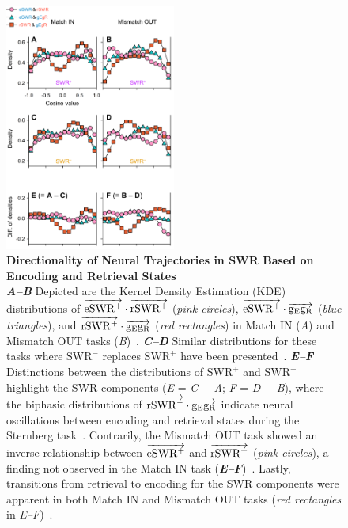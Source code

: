 \documentclass[final,3p,times,twocolumn]{elsarticle}
\begin{document}
        \clearpage
        \begin{figure}[ht]
        	\centering
            \includegraphics[width=0.5\textwidth]{./src/figures/.png/Figure_ID_07.png}
        	\caption{\textbf{
Directionality of Neural Trajectories in SWR Based on Encoding and Retrieval States
}
\smallskip
\\
\textbf{\textit{A--B}} Depicted are the Kernel Density Estimation (KDE) distributions of $\protect\overrightarrow{{\mathrm{eSWR^+}}} \cdot \protect\overrightarrow{{\mathrm{rSWR^+}}}$ (\textit{pink circles}), $\protect\overrightarrow{{\mathrm{eSWR^+}}} \cdot \protect\overrightarrow{{\mathrm{g_{E}g_{R}}}}$ (\textit{blue triangles}), and $\protect\overrightarrow{{\mathrm{rSWR^+}}} \cdot \protect\overrightarrow{{\mathrm{g_{E}g_{R}}}}$ (\textit{red rectangles}) in Match IN (\textit{A}) and Mismatch OUT tasks (\textit{B})~\cite{li_functional_2023}. \textbf{\textit{C--D}} Similar distributions for these tasks where $\mathrm{SWR^-}$ replaces $\mathrm{SWR^+}$ have been presented~\cite{dimakopoulos_information_2022}. \textbf{\textit{E--F}} Distinctions between the distributions of $\mathrm{SWR^+}$ and $\mathrm{SWR^-}$ highlight the SWR components (\textit{E} = \textit{C} $-$ \textit{A}; \textit{F} = \textit{D} $-$ \textit{B}), where the biphasic distributions of $\protect\overrightarrow{{\mathrm{rSWR^-}}} \cdot \protect\overrightarrow{{\mathrm{g_{E}g_{R}}}}$ indicate neural oscillations between encoding and retrieval states during the Sternberg task~\cite{borders_hippocampus_2022}. Contrarily, the Mismatch OUT task showed an inverse relationship between $\protect\overrightarrow{{\mathrm{eSWR^+}}}$ and $\protect\overrightarrow{{\mathrm{rSWR^+}}}$ (\textit{pink circles}), a finding not observed in the Match IN task (\textbf{\textit{E--F}})~\cite{naber_reciprocal_2001,van_strien_anatomy_2009}. Lastly, transitions from retrieval to encoding for the SWR components were apparent in both Match IN and Mismatch OUT tasks (\textit{red rectangles} in \textit{E--F})~\cite{niediek_reliable_2016,schomburg_spiking_2012}.
}
        	\label{fig:07}
        \end{figure}


\end{document}
